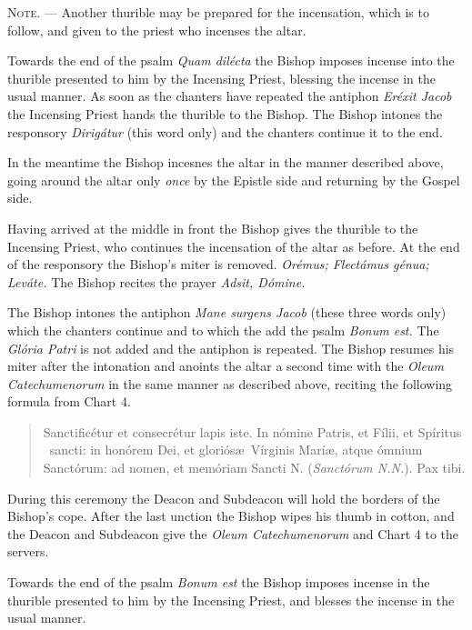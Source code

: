 \documentclass[letterpaper]{report}
\begin{document}
{    \textsc{Note. ---} Another thurible may be prepared for the incensation,
    which is to follow, and given to the priest who incenses the altar.

    \rubric Towards the end of the psalm \textit{Quam dil\'ecta} the Bishop
    imposes incense into the thurible presented to him by the Incensing Priest,
    blessing the incense in the usual manner. As soon as the chanters have
    repeated the antiphon \textit{Er\'exit Jacob} the Incensing Priest hands
    the thurible to the Bishop. The Bishop intones the responsory
    \textit{Dirig\'atur} (this word only) and the chanters continue it to the
    end.

    In the meantime the Bishop incesnes the altar in the manner described
    above, going around the altar only \textit{once} by the Epistle side and
    returning by the Gospel side.

    \rubric Having arrived at the middle in front the Bishop gives the thurible
    to the Incensing Priest, who continues the incensation of the altar as
    before. At the end of the responsory the Bishop's miter is removed.
    \textit{Orémus; Flectámus génua; Leváte.} The Bishop recites the prayer
    \textit{Adsit, Dómine.}

    \rubric The Bishop intones the antiphon \textit{Mane surgens Jacob} (these
    three words only) which the chanters continue and to which the add the
    psalm \textit{Bonum est.} The \textit{Gl\'oria Patri} is not added and the
    antiphon is repeated. The Bishop resumes his miter after the intonation and
    anoints the altar a second time with the \textit{Oleum Catechumenorum} in
    the same manner as described above, reciting the following formula from
    Chart 4.

    \begin{quote}
        Sancti\cross ficétur et conse\cross crétur lapis iste. In nómine
        Pa\cross tris, et Fí\cross lii, et Spíritus \cross\ sancti: in honórem
        Dei, et gloriós\ae\ Vírginis Marí\ae, atque ómnium Sanctórum: ad nomen,
        et memóriam Sancti N. (\textit{Sanctórum N.N.}). Pax tibi.
    \end{quote}

    During this ceremony the Deacon and Subdeacon will hold the borders of the
    Bishop's cope. After the last unction the Bishop wipes his thumb in cotton, and
    the Deacon and Subdeacon give the \textit{Oleum Catechumenorum} and Chart 4 to
    the servers.

    \rubric Towards the end of the psalm \textit{Bonum est} the Bishop imposes
    incense in the thurible presented to him by the Incensing Priest, and
    blesses the incense in the usual manner.

}
\end{document}

